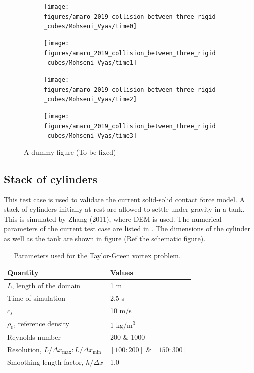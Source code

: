 \documentclass[preprint,12pt]{elsarticle}
\begin{document}
\begin{figure}[!htpb]
  \centering
  \begin{subfigure}{0.48\textwidth}
    \centering
    \texttt{[image: figures/amaro\_2019\_collision\_between\_three\_rigid\_cubes/Mohseni\_Vyas/time0]}
  \end{subfigure}
  \begin{subfigure}{0.48\textwidth}
    \centering
    \texttt{[image: figures/amaro\_2019\_collision\_between\_three\_rigid\_cubes/Mohseni\_Vyas/time1]}
  \end{subfigure}

  \begin{subfigure}{0.48\textwidth}
    \centering
    \texttt{[image: figures/amaro\_2019\_collision\_between\_three\_rigid\_cubes/Mohseni\_Vyas/time2]}
  \end{subfigure}
  \begin{subfigure}{0.48\textwidth}
    \centering
    \texttt{[image: figures/amaro\_2019\_collision\_between\_three\_rigid\_cubes/Mohseni\_Vyas/time3]}
  \end{subfigure}
\caption{A dummy figure (To be fixed)}
\label{fig:snapshots-three-cubes-colliding}
\end{figure}
%


\FloatBarrier%
\subsection{Stack of cylinders}
\label{sec:stack-of-cylinders}

This test case is used to validate the current solid-solid contact force
model. A stack of cylinders initially at rest are allowed to settle under
gravity in a tank. This is simulated by Zhang (2011), where DEM is used. The
numerical parameters of the current test case are listed in
. The dimensions of the cylinder as well as the
tank are shown in figure (Ref the schematic figure).

\begin{table}[!ht]
  \centering
  \begin{tabular}[!ht]{ll}
    \toprule
    Quantity & Values\\
    \midrule
    $L$, length of the domain & 1 m \\
    Time of simulation & 2.5 s \\
    $c_s$ & 10 m/s \\
    $\rho_0$, reference density & 1 kg/m\textsuperscript{3} \\
    Reynolds number & 200 \& 1000 \\
    Resolution, $L/\Delta x_{\max} : L/\Delta x_{\min}$ & $[100:200]$ \& $[150:300]$\\
    Smoothing length factor, $h/\Delta x$ & 1.0\\
    \bottomrule
  \end{tabular}
  \caption{Parameters used for the Taylor-Green vortex problem.}%
  \label{tab:stack-of-cylinders}
\end{table}
\end{document}
